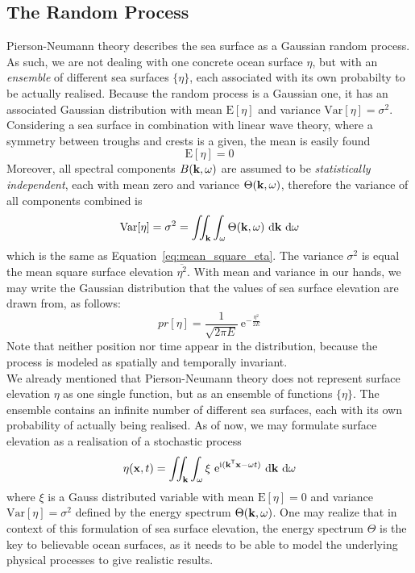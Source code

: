 \subsection{The Random Process}
\label{sec:random_process}
Pierson-Neumann theory describes the sea surface as a Gaussian random process.
As such, we are not dealing with one concrete ocean surface $\eta$, but with an
\emph{ensemble} of different sea surfaces $\{\eta\}$, each associated with its
own probabilty to be actually realised. Because the random process is a
Gaussian one, it has an associated Gaussian distribution with mean
$\mathrm{E}[\eta]$ and variance $\mathrm{Var}[\eta] = \sigma^2$. Considering a
sea surface in combination with linear wave theory, where a symmetry between
troughs and crests is a given, the mean is easily found
\begin{equation}
 \mathrm{E}[\eta] = 0
\end{equation}
%
Moreover, all spectral components $B(\mathbf{k},\omega)$ are assumed to be
\emph{statistically independent}, each with mean zero and variance $\Theta(\mathbf{k},\omega)$,
therefore the variance of all components combined is
\begin{equation}
\label{eq:random_process_variance}
\mathrm{Var}[\eta] = \sigma^2 = \iint_{\mathbf{k}}
\int_{\omega}\Theta(\mathbf{k},\omega)~\mathrm{d}\mathbf{k}~\mathrm{ d}\omega
\end{equation}
which is the same as Equation~\ref{eq:mean_square_eta}. The variance
$\sigma^2$ is equal the mean square surface elevation $\overline{\eta^2}$. With
mean and variance in our hands, we may write the Gaussian distribution that the
values of sea surface elevation are drawn from, as follows:
\begin{equation}
\label{eq:gaussian_dist}
 pr[\eta] = \frac{1}{\sqrt{2\pi E}}~\mathrm{e}^{-\frac{\eta^2}{2E}}
\end{equation}
Note that neither position nor time appear in the distribution, because the
process is modeled as spatially and temporally invariant.\\

We already mentioned that Pierson-Neumann theory does not represent surface
elevation $\eta$ as one single function, but as an ensemble of functions
$\{\eta\}$. The ensemble contains an infinite number of different sea surfaces,
each with its own probability of actually being realised. As of now, we may
formulate surface elevation as a realisation of a stochastic process
\begin{equation}
\label{eq:surface_elevation_gauss}
 \eta(\mathbf{x}, t) = \iint_{\mathbf{k}}\int_{\omega} \xi
~\mathrm{e}^{\mathrm{i}(\mathbf{k}^{\mathsf{T}}\mathbf{x}-
\omega t)}~
\mathrm{d}\mathbf{k}~\mathrm{d}\omega
\end{equation}
where $\xi$ is a Gauss distributed variable with mean $\mathrm{E}[\eta] = 0$ and
variance $\mathrm{Var}[\eta] = \sigma^2$ defined by the energy spectrum
$\Theta(\mathbf{k}, \omega)$. One may realize that in context of this formulation
of sea surface elevation, the energy spectrum $\Theta$ is the key to believable
ocean surfaces, as it needs to be able to model the underlying physical
processes to give realistic results.\\

